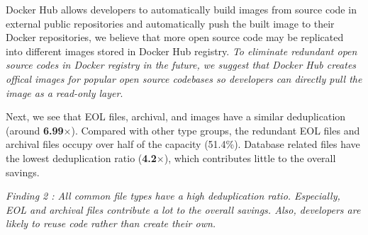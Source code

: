 Docker Hub allows developers to automatically build images from
source code in external public repositories and automatically push the built
image to their Docker repositories, we believe that more open source code
may be replicated into different images stored in Docker Hub registry.
%
\textit{To eliminate redundant open source codes in Docker registry in the
future, we suggest that Docker Hub creates offical images for popular
open source codebases so developers can directly pull the image as a
read-only layer}.

Next, we see that EOL files, archival, and images have a similar deduplication
(around \textbf{6.99$\times$}). 
%
Compared with other type groups, the redundant EOL files and archival files
occupy over half of the capacity (51.4\%). 
% 
Database related files have the lowest deduplication ratio (\textbf{4.2$\times$}),
which contributes little to the overall savings.

\textit{Finding 2 : All common file types have a high deduplication ratio.
Especially, EOL and archival files contribute a lot to the overall savings.
Also, developers are likely to reuse code rather than create their
own. }

